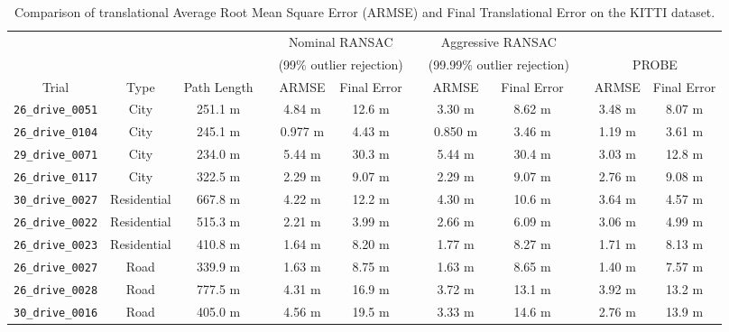 \begin{table}
    \centering
    \caption{Comparison of translational Average Root Mean Square Error (ARMSE) and Final Translational Error on the KITTI dataset.}

    \begin{threeparttable}
        \begin{tabular}{cccccccccccc}
        & & & & \multicolumn{2}{c}{Nominal RANSAC} & & \multicolumn{2}{c}{Aggressive RANSAC} & & &  \\
        	 & & & & \multicolumn{2}{c}{(99\% outlier rejection)} & & \multicolumn{2}{c}{(99.99\% outlier rejection)} & & \multicolumn{2}{c}{PROBE} \B \\
             \cline{5-6} \cline{8-9} \cline{11-12}
        	 Trial & Type & Path Length &&  ARMSE & Final Error & & ARMSE & Final Error & & ARMSE & Final Error \T\B \\ \hline \T
        	\texttt{26\_drive\_0051} & City \tnote{1} & 251.1 m && 4.84 m & 12.6 m && 3.30 m & 8.62 m && 3.48 m & 8.07 m \\
        	\texttt{26\_drive\_0104} & City \tnote{1} & 245.1 m && 0.977 m & 4.43 m && 0.850 m & 3.46 m && 1.19 m & 3.61 m \\ 
        	\texttt{29\_drive\_0071} & City \tnote{1} & 234.0 m && 5.44 m & 30.3 m && 5.44 m & 30.4 m && 3.03 m & 12.8 m \\ 
        		\texttt{26\_drive\_0117} & City \tnote{1} & 322.5 m && 2.29 m & 9.07 m && 2.29 m & 9.07 m && 2.76 m & 9.08 m \\ 
        		\texttt{30\_drive\_0027} & Residential \tnote{1, \dag} & 667.8 m && 4.22 m & 12.2 m && 4.30 m & 10.6 m && 3.64 m & 4.57 m \\ 
        		\texttt{26\_drive\_0022} & Residential \tnote{2} & 515.3 m && 2.21 m & 3.99 m && 2.66 m & 6.09 m && 3.06 m & 4.99 m \\ 
        		\texttt{26\_drive\_0023} & Residential \tnote{2} & 410.8 m && 1.64 m & 8.20 m && 1.77 m & 8.27 m && 1.71 m & 8.13 m \\ 
        		\texttt{26\_drive\_0027} & Road \tnote{3} & 339.9 m && 1.63 m & 8.75 m && 1.63 m & 8.65 m && 1.40 m & 7.57 m \\ 
        		\texttt{26\_drive\_0028} & Road \tnote{3} & 777.5 m && 4.31 m & 16.9 m && 3.72 m & 13.1 m && 3.92 m & 13.2 m \\ 
        		\texttt{30\_drive\_0016} & Road \tnote{3} & 405.0 m && 4.56 m & 19.5 m && 3.33 m & 14.6 m && 2.76 m & 13.9 m \\ 

\end{tabular}
\end{threeparttable}
\end{table}

